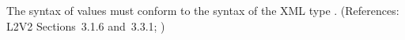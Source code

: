 The syntax of   values must conform to the syntax of the
XML type .  (References: L2V2 Sections~3.1.6 and~3.3.1;
)
